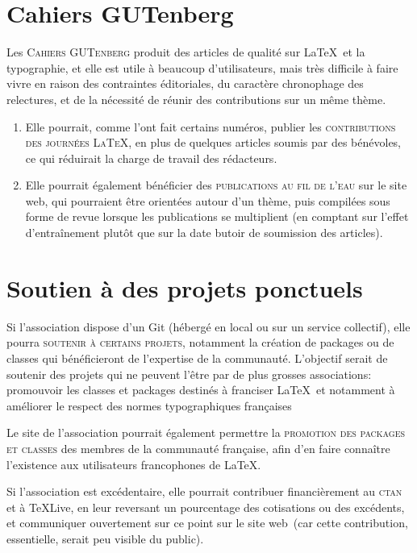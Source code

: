 \documentclass{tufte-handout}
\newcommand{\ratio}[3][]{\marginpar{\footnotesize{\textcolor{teal}{Temps requis: #2 / Utilité: #3}\par\noindent \textcolor{teal}{#1}}}}
\begin{document}
\section{Cahiers GUTenberg}

Les \textsc{Cahiers GUTenberg}\ratio[Chronophage, mais utile à la communauté et susceptible de bénéficier des autres projets]{++}{+++} produit des articles de qualité sur \LaTeX\ et la typographie, et elle est utile à beaucoup d'utilisateurs, mais très difficile à faire vivre en raison des contraintes éditoriales, du caractère chronophage des relectures, et de la nécessité de réunir des contributions sur un même thème.

\begin{enumerate}
	\item Elle pourrait, comme l'ont fait certains numéros, publier les \textsc{contributions des journées \LaTeX}, en plus de quelques articles soumis par des bénévoles, ce qui réduirait la charge de travail des rédacteurs.
	\item Elle pourrait également bénéficier des \textsc{publications au fil de l'eau} sur le site web, qui pourraient être orientées autour d'un thème, puis compilées sous forme de revue lorsque les publications se multiplient (en comptant sur l'effet d'entraînement plutôt que sur la date butoir de soumission des articles).
\end{enumerate}


\section{Soutien à des projets ponctuels}

Si l'association dispose d'un Git\ratio[Sur la base du bénévolat uniquement]{+}{++} (hébergé en local ou sur un service collectif), elle pourra \textsc{soutenir à certains projets}, notamment la création de packages ou de classes qui bénéficieront de l'expertise de la communauté. L'objectif serait de soutenir des projets qui ne peuvent l'être par de plus grosses associations: promouvoir les classes et packages destinés à franciser \LaTeX\, et notamment à améliorer le respect des normes typographiques françaises

Le site de l'association\ratio[Simple mise à jour du site]{+}{+++} pourrait également permettre la \textsc{promotion des packages et classes} des membres de la communauté française, afin d'en faire connaître l'existence aux utilisateurs francophones de \LaTeX.

Si l'association est excédentaire\ratio[C'est encore un futur éloigné]{+}{+++}, elle pourrait contribuer financièrement au \textsc{ctan} et à \TeX Live, en leur reversant un pourcentage des cotisations ou des excédents, et communiquer ouvertement sur ce point sur le site web~(car cette contribution, essentielle, serait peu visible du public).
\end{document}
